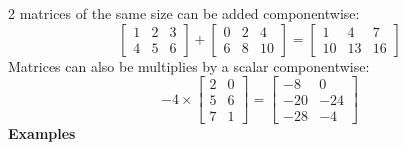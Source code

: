 \documentclass[]{article}
\begin{document}
		2 matrices of the same size can be added componentwise:
		$$
			\begin{bmatrix}
				{1} & {2} & {3}\\
				{4} & {5} & {6}
			\end{bmatrix}+
			\begin{bmatrix}
				{0} & {2} & {4}\\
				{6} & {8} & {10}
			\end{bmatrix}=
			\begin{bmatrix}
				{1} & {4} & {7}\\
				{10} & {13} & {16}
			\end{bmatrix}
		$$
		Matrices can also be multiplies by a scalar componentwise:
		$$
			-4\times
			\begin{bmatrix}
				{2} & {0}\\
				{5} & {6}\\
				{7} & {1}
			\end{bmatrix}=
			\begin{bmatrix}
				{-8} & {0}\\
				{-20} & {-24}\\
				{-28} & {-4}
			\end{bmatrix}
		$$
		{\bf Examples}
\end{document}
